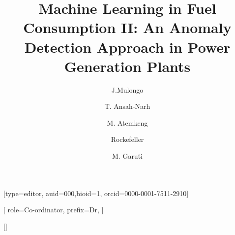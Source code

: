 \documentclass[a4paper,fleqn]{cas-dc}
\begin{document}
\let\WriteBookmarks\relax
\def\floatpagepagefraction{1}
\def\textpagefraction{.001}

\title [mode = title]{Machine Learning in Fuel Consumption II: An Anomaly Detection Approach in Power Generation Plants}                      






\author[1]{J.Mulongo}[type=editor,
                        auid=000,bioid=1,
                        orcid=0000-0001-7511-2910]
\cormark[1]


\address[1]{Mathematical Sciences (AIMS-Cameroon)}



\author[2,3]{T. Ansah-Narh}
\cormark[2]

\author[4]{M. Atemkeng}[%
role=Co-ordinator,
prefix=Dr,
]


\address[2]{Centre for Radio Astronomy \& Astrophysics, Ghana Space Science and Technology Institute, Ghana Atomic Energy Commission, P. O. Box LG 80, Legon - Accra, Ghana}

\author[5]{Rockefeller}

\author[4] {M. Garuti}[]
%
\cormark[2]

\address[3]{Space \& Atmospheric Research Group, Ghana Space Science and Technology Institute, Ghana Atomic Energy Commission, P. O. Box LG 80, Legon - Accra, Ghana}
\end{document}
